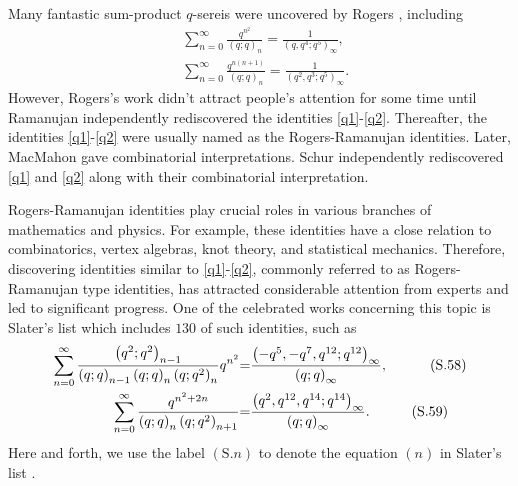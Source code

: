 \documentclass[reqno,12pt]{amsart}
\theoremstyle{remark}
\numberwithin{equation}{section}
\begin{document}
Many fantastic sum-product $q$-sereis were uncovered by Rogers \cite{Rogers}, including
\begin{align}
&\sum_{n=0}^{\infty}\frac{q^{n^2}}{\left(q;q\right)_n}
=\frac{1}{\left(q,q^4;q^5\right)_{\infty}},\label{q1}\\
&
\sum_{n=0}^{\infty}\frac{q^{n(n+1)}}{\left(q;q\right)_n}
=\frac{1}{\left(q^2,q^3;q^5\right)_{\infty}}.\label{q2}
\end{align}
However, Rogers's work didn't attract people's attention for some time until Ramanujan independently rediscovered  the identities \eqref{q1}-\eqref{q2}. Thereafter, the identities \eqref{q1}-\eqref{q2} were usually named as the Rogers-Ramanujan identities. Later, MacMahon \cite{MacMahon} gave combinatorial interpretations.  Schur \cite{Schur} independently rediscovered \eqref{q1} and \eqref{q2} along with their combinatorial interpretation.

Rogers-Ramanujan identities play crucial roles in various branches of mathematics and physics. For example, these identities have a close relation to combinatorics, vertex algebras, knot theory, and statistical mechanics.
Therefore, discovering identities similar to \eqref{q1}-\eqref{q2}, commonly  referred to as Rogers-Ramanujan type identities, has attracted considerable attention from experts and led to significant progress. One of the celebrated  works concerning this topic is Slater's list \cite{Slater} which includes $130$ of such identities, such as
\cite[Eqs. (58), (59)]{Slater}
\begin{align*}
\sum_{n=0}^{\infty}\frac{\left(q^2;q^2\right)_{n-1}}
{\left(q;q\right)_{n-1}\left(q;q\right)_n\left(q;q^2\right)_n}q^{n^2}
&{=}\frac{\left(-q^5,-q^7,q^{12};q^{12}\right)_{\infty}}{\left(q;q\right)_{\infty}},
\quad{\tag{S.58}}
\\
\sum_{n=0}^{\infty}\frac{q^{n^2+2n}}
{\left(q;q\right)_n\left(q;q^2\right)_{n+1}}
&{=}\frac{\left(q^2,q^{12},q^{14};q^{14}\right)_{\infty}}
{\left(q;q\right)_{\infty}}.\quad {\tag{S.59}}
\end{align*}
Here and forth, we use the label $\left(\mathrm{S}.n\right)$ to denote the equation $(n)$ in Slater's list \cite{Slater}.
\end{document}
